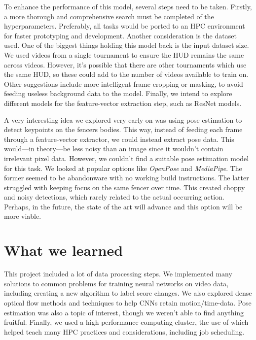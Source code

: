 \documentclass[10pt,twocolumn,letterpaper]{article}
\begin{document}
To enhance the performance of this model, several steps need to be taken.
Firstly, a more thorough and comprehensive search must be completed of the hyperparameters.
Preferably, all tasks would be ported to an HPC environment for faster prototyping and development.
Another consideration is the dataset used.
One of the biggest things holding this model back is the input dataset size.
We used videos from a single tournament to ensure the HUD remains the same across videos.
However, it's possible that there are other tournaments which use the same HUD, so these could add to the number of videos available to train on.
Other suggestions include more intelligent frame cropping or masking, to avoid feeding useless background data to the model.
Finally, we intend to explore different models for the feature-vector extraction step, such as ResNet models.

A very interesting idea we explored very early on was using pose estimation to detect keypoints on the fencers bodies.
This way, instead of feeding each frame through a feature-vector extractor, we could instead extract pose data.
This would---in theory---be less noisy than an image since it wouldn't contain irrelevant pixel data.
However, we couldn't find a suitable pose estimation model for this task.
We looked at popular options like \textit{OpenPose} and \textit{MediaPipe}.
The former seemed to be abandonware with no working build instructions.
The latter struggled with keeping focus on the same fencer over time.
This created choppy and noisy detections, which rarely related to the actual occurring action.
Perhaps, in the future, the state of the art will advance and this option will be more viable.

\section{What we learned}

This project included a lot of data processing steps.
We implemented many solutions to common problems for training neural networks on video data, including creating a new algorithm to label score changes.
We also explored dense optical flow methods and techniques to help CNNs retain motion/time-data.
Pose estimation was also a topic of interest, though we weren't able to find anything fruitful.
Finally, we used a high performance computing cluster, the use of which helped teach many HPC practices and considerations, including job scheduling.
\end{document}
